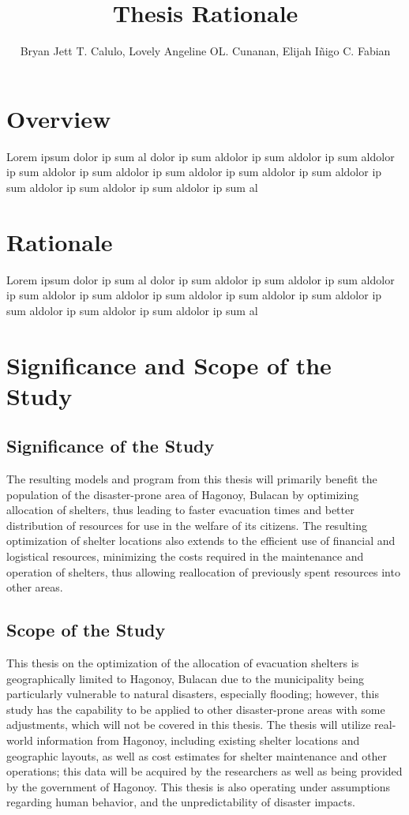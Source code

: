 \documentclass[english,10pt,a4paper]{article}
\title{Thesis Rationale}
\author{Bryan Jett T. Calulo, Lovely Angeline OL. Cunanan, Elijah Iñigo C. Fabian}
\begin{document}
	\maketitle
	
	\section*{Overview}
	Lorem ipsum dolor ip sum al dolor ip sum aldolor ip sum aldolor ip sum aldolor ip sum aldolor ip sum aldolor ip sum aldolor ip sum aldolor ip sum aldolor ip sum aldolor ip sum aldolor ip sum aldolor ip sum al
	
	\section*{Rationale}
	Lorem ipsum dolor ip sum al dolor ip sum aldolor ip sum aldolor ip sum aldolor ip sum aldolor ip sum aldolor ip sum aldolor ip sum aldolor ip sum aldolor ip sum aldolor ip sum aldolor ip sum aldolor ip sum al
	
	\section*{Significance and Scope of the Study}
		\subsection*{Significance of the Study}
			The resulting models and program from this thesis will primarily benefit the population of the disaster-prone area of Hagonoy, Bulacan by optimizing allocation of shelters, thus leading to faster evacuation times and better distribution of resources for use in the welfare of its citizens. The resulting optimization of shelter locations also extends to the efficient use of financial and logistical resources, minimizing the costs required in the maintenance and operation of shelters, thus allowing reallocation of previously spent resources into other areas.
		\subsection*{Scope of the Study}
			This thesis on the optimization of the allocation of evacuation shelters is geographically limited to Hagonoy, Bulacan due to the municipality being particularly vulnerable to natural disasters, especially flooding; however, this study has the capability to be applied to other disaster-prone areas with some adjustments, which will not be covered in this thesis. The thesis will utilize real-world information from Hagonoy, including existing shelter locations and geographic layouts, as well as cost estimates for shelter maintenance and other operations; this data will be acquired by the researchers as well as being provided by the government of Hagonoy. This thesis is also operating under assumptions regarding human behavior, and the unpredictability of disaster impacts.
	
	
\end{document}
